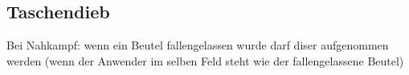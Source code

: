 \subsection{Taschendieb}

Bei Nahkampf: wenn ein Beutel fallengelassen wurde darf diser aufgenommen werden (wenn der Anwender im selben Feld steht wie der fallengelassene Beutel)